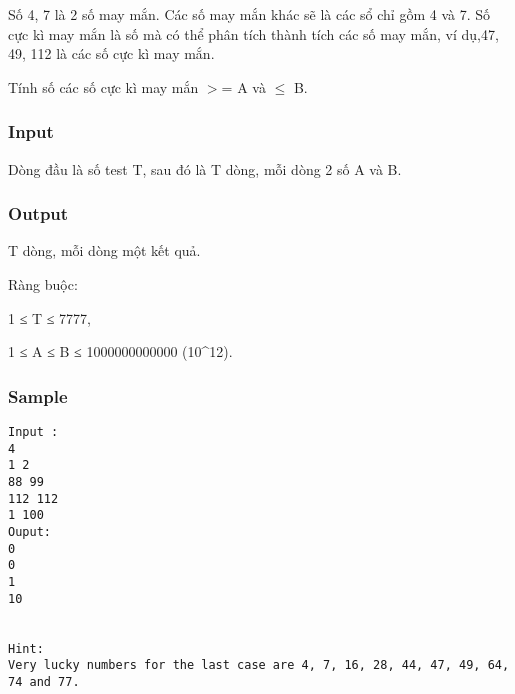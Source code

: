 



   Số 4, 7 là 2 số may mắn. Các số may mắn khác sẽ là các sổ chỉ gồm 4 và 7.  Số cực kì may mắn là số mà có thể phân tích thành tích các số may mắn,  ví dụ,47, 49, 112 là các số cực kì may mắn.  

   Tính số các số cực kì may mắn $>$= A và  $\le$ B.  



\subsubsection{   Input  }



   Dòng đầu là số test T, sau đó là T dòng, mỗi dòng 2 số A và B.  



\subsubsection{   Output  }



   T dòng, mỗi dòng một kết quả.  

   Ràng buộc:  

   1 ≤ T ≤ 7777,  

   1 ≤ A ≤ B ≤ 1000000000000 (10\textasciicircum12).  



\subsubsection{   Sample  }
\begin{verbatim}
Input :
4 
1 2 
88 99 
112 112 
1 100 
Ouput: 
0 
0 
1 
10 

 
Hint: 
Very lucky numbers for the last case are 4, 7, 16, 28, 44, 47, 49, 64, 74 and 77. 
\end{verbatim}
